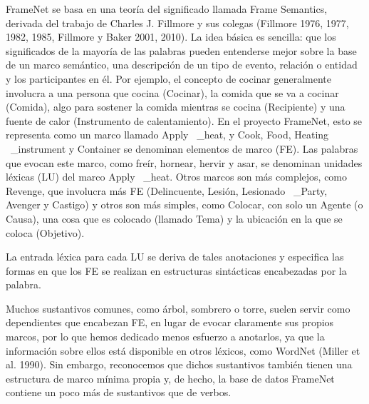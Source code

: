 FrameNet se basa en una teoría del significado llamada Frame Semantics, derivada del trabajo de Charles J. Fillmore y sus colegas (Fillmore 1976, 1977, 1982, 1985, Fillmore y Baker 2001, 2010). La idea básica es sencilla: que los significados de la mayoría de las palabras pueden entenderse mejor sobre la base de un marco semántico, una descripción de un tipo de evento, relación o entidad y los participantes en él. Por ejemplo, el concepto de cocinar generalmente involucra a una persona que cocina (Cocinar), la comida que se va a cocinar (Comida), algo para sostener la comida mientras se cocina (Recipiente) y una fuente de calor (Instrumento de calentamiento). En el proyecto FrameNet, esto se representa como un marco llamado Apply \ _heat, y Cook, Food, Heating \ _instrument y Container se denominan elementos de marco (FE). Las palabras que evocan este marco, como freír, hornear, hervir y asar, se denominan unidades léxicas (LU) del marco Apply \ _heat. Otros marcos son más complejos, como Revenge, que involucra más FE (Delincuente, Lesión, Lesionado \ _Party, Avenger y Castigo) y otros son más simples, como Colocar, con solo un Agente (o Causa), una cosa que es colocado (llamado Tema) y la ubicación en la que se coloca (Objetivo).

La entrada léxica para cada LU se deriva de tales anotaciones y especifica las formas en que los FE se realizan en estructuras sintácticas encabezadas por la palabra.

Muchos sustantivos comunes, como árbol, sombrero o torre, suelen servir como dependientes que encabezan FE, en lugar de evocar claramente sus propios marcos, por lo que hemos dedicado menos esfuerzo a anotarlos, ya que la información sobre ellos está disponible en otros léxicos, como WordNet (Miller et al. 1990). Sin embargo, reconocemos que dichos sustantivos también tienen una estructura de marco mínima propia y, de hecho, la base de datos FrameNet contiene un poco más de sustantivos que de verbos.

